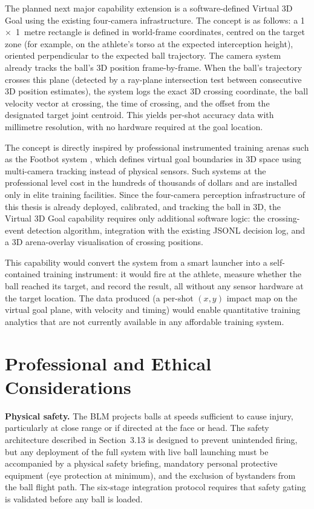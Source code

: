 The planned next major capability extension is a software-defined Virtual 3D Goal using the existing four-camera infrastructure. The concept is as follows: a 1~$\times$~1~metre rectangle is defined in world-frame coordinates, centred on the target zone (for example, on the athlete's torso at the expected interception height), oriented perpendicular to the expected ball trajectory. The camera system already tracks the ball's 3D position frame-by-frame. When the ball's trajectory crosses this plane (detected by a ray-plane intersection test between consecutive 3D position estimates), the system logs the exact 3D crossing coordinate, the ball velocity vector at crossing, the time of crossing, and the offset from the designated target joint centroid. This yields per-shot accuracy data with millimetre resolution, with no hardware required at the goal location.

The concept is directly inspired by professional instrumented training arenas such as the Footbot system \cite{ref35}, which defines virtual goal boundaries in 3D space using multi-camera tracking instead of physical sensors. Such systems at the professional level cost in the hundreds of thousands of dollars and are installed only in elite training facilities. Since the four-camera perception infrastructure of this thesis is already deployed, calibrated, and tracking the ball in 3D, the Virtual 3D Goal capability requires only additional software logic: the crossing-event detection algorithm, integration with the existing JSONL decision log, and a 3D arena-overlay visualisation of crossing positions.

This capability would convert the system from a smart launcher into a self-contained training instrument: it would fire at the athlete, measure whether the ball reached its target, and record the result, all without any sensor hardware at the target location. The data produced (a per-shot $(x, y)$ impact map on the virtual goal plane, with velocity and timing) would enable quantitative training analytics that are not currently available in any affordable training system.

\section{Professional and Ethical Considerations}

\textbf{Physical safety.} The BLM projects balls at speeds sufficient to cause injury, particularly at close range or if directed at the face or head. The safety architecture described in Section~3.13 is designed to prevent unintended firing, but any deployment of the full system with live ball launching must be accompanied by a physical safety briefing, mandatory personal protective equipment (eye protection at minimum), and the exclusion of bystanders from the ball flight path. The six-stage integration protocol requires that safety gating is validated before any ball is loaded.

